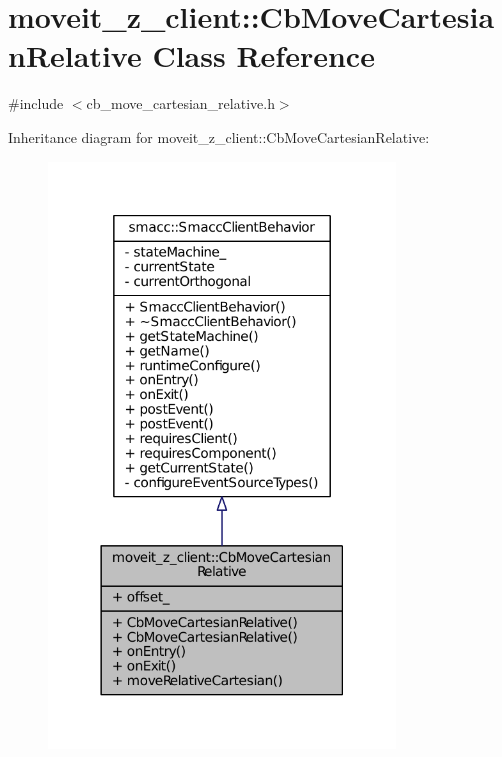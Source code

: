 \hypertarget{classmoveit__z__client_1_1CbMoveCartesianRelative}{}\section{moveit\+\_\+z\+\_\+client\+:\+:Cb\+Move\+Cartesian\+Relative Class Reference}
\label{classmoveit__z__client_1_1CbMoveCartesianRelative}


{\ttfamily \#include $<$cb\+\_\+move\+\_\+cartesian\+\_\+relative.\+h$>$}



Inheritance diagram for moveit\+\_\+z\+\_\+client\+:\+:Cb\+Move\+Cartesian\+Relative\+:
\nopagebreak
\begin{figure}[H]
\begin{center}
\leavevmode
\includegraphics[width=261pt]{classmoveit__z__client_1_1CbMoveCartesianRelative__inherit__graph}
\end{center}
\end{figure}


